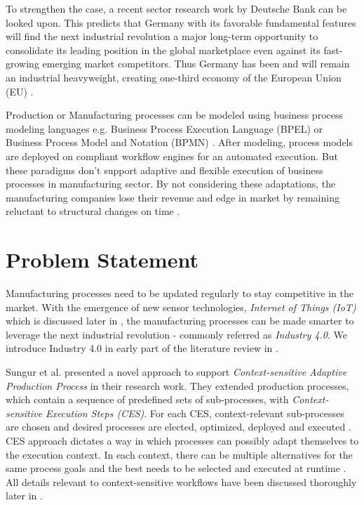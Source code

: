 To strengthen the case, a recent sector research work by Deutsche Bank \cite{DBHENG} can be looked upon. This predicts that Germany with its favorable fundamental features will find the next industrial revolution a major long-term opportunity to consolidate its leading position in the global marketplace even against its fast-growing emerging market competitors. Thus Germany has been and will remain an industrial heavyweight, creating one-third economy of the European Union (\acs{EU}) \cite{DBHENG}.

Production or Manufacturing processes can be modeled using business process modeling languages e.g. Business Process Execution Language (\acs{BPEL}) \cite{BPELSPEC} or Business Process Model and Notation (\acs{BPMN}) \cite{OMGSPEC}. After modeling, process models are deployed on compliant workflow engines for an automated execution. But these paradigms don't support adaptive and flexible execution of business processes in manufacturing sector. By not considering these adaptations, the manufacturing companies lose their revenue and edge in market by remaining reluctant to structural changes on time \cite{TIMURCIRP,CONWORKFLOW}.

\section{Problem Statement}
Manufacturing processes need to be updated regularly to stay competitive in the market. With the emergence of new sensor technologies, \textit{Internet of Things (\acs{IoT})} which is discussed later in , the manufacturing processes can be made smarter to leverage the next industrial revolution - commonly referred as \textit{Industry 4.0}. We introduce Industry 4.0 in early part of the literature review in .

Sungur et al. \cite{TIMURCIRP} presented a novel approach to support \textit{Context-sensitive Adaptive Production Process} in their research work. They extended production processes, which contain a sequence of predefined sets of sub-processes, with \textit{Context-sensitive Execution Steps (\acs{CES})}. For each \acs{CES}, context-relevant sub-processes are chosen and desired processes are elected, optimized, deployed and executed \cite{TIMURCIRP}. \acs{CES} approach dictates a way in which processes can possibly adapt themselves to the execution context. In each context, there can be multiple alternatives for the same process goals and the best needs to be selected and executed at runtime \cite{TIMURCIRP}. All details relevant to context-sensitive workflows have been discussed thoroughly later in .

